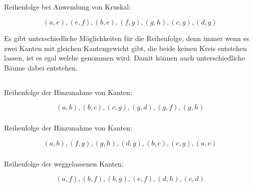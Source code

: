 \documentclass[10pt,a4paper,oneside,ngerman,numbers=noenddot]{scrartcl}
\begin{document}
	\subsection{} %
		Reihenfolge bei Anwendung von Kruskal:
		
		\[
			(a,e), (e,f), (b,e), (f,g), (g,h), (c,g), (d,g)
		\]
		
		Es gibt unterschiedliche Möglichkeiten für die Reihenfolge, denn immer wenn es zwei Kanten mit gleichen Kantengewicht gibt, die beide keinen Kreis entstehen lassen, ist es egal welche genommen wird. Damit können auch unterschiedliche Bäume dabei entstehen.
	\subsection{} %
		\subsubsection{} %
			Reihenfolge der Hinzunahme von Kanten:
			
			\[
				(a,b), (b,c), (c,g), (g,d), (g,f), (g,h)
			\]
		\subsubsection{} %
			Reihenfolge der Hinzunahme von Kanten:
			
			\[
				(a,b), (f,g), (g,h), (d,g), (b,c), (c,g), (a,e)
			\]
		\subsubsection{} %
			Reihenfolge der weggelassenen Kanten:
			
			\[
				(a,f), (b,f), (b,g), (e,f), (d,h), (c,d)
			\]
\end{document}
